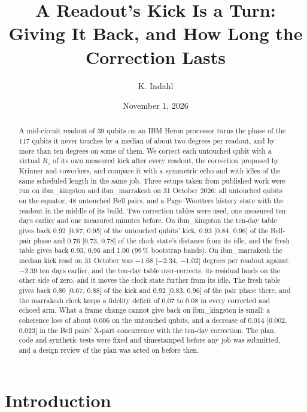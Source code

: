 \documentclass[reprint,amsmath,amssymb,aps,superscriptaddress,nofootinbib]{revtex4-2}
\begin{document}
\title{A Readout's Kick Is a Turn: Giving It Back, and How Long the Correction Lasts}

\author{K. Indahl}

\date{November 1, 2026}

\begin{abstract}
A mid-circuit readout of 39 qubits on an IBM Heron processor turns the phase of the 117 qubits it never touches by a median of about two degrees per readout, and by more than ten degrees on some of them. We correct each untouched qubit with a virtual $R_z$ of its own measured kick after every readout, the correction proposed by Krinner and coworkers, and compare it with a symmetric echo and with idles of the same scheduled length in the same job. Three setups taken from published work were run on ibm\_kingston and ibm\_marrakesh on 31 October 2026: all untouched qubits on the equator, 48 untouched Bell pairs, and a Page--Wootters history state with the readout in the middle of its build. Two correction tables were used, one measured ten days earlier and one measured minutes before. On ibm\_kingston the ten-day table gives back 0.92 [0.87, 0.95] of the untouched qubits' kick, 0.93 [0.84, 0.96] of the Bell-pair phase and 0.76 [0.73, 0.78] of the clock state's distance from its idle, and the fresh table gives back 0.93, 0.96 and 1.00 (99\,\% bootstrap bands). On ibm\_marrakesh the median kick read on 31 October was $-1.68$ [$-2.34$, $-1.02$] degrees per readout against $-2.39$ ten days earlier, and the ten-day table over-corrects: its residual lands on the other side of zero, and it moves the clock state further from its idle. The fresh table gives back 0.80 [0.67, 0.88] of the kick and 0.92 [0.83, 0.96] of the pair phase there, and the marrakesh clock keeps a fidelity deficit of 0.07 to 0.08 in every corrected and echoed arm. What a frame change cannot give back on ibm\_kingston is small: a coherence loss of about 0.006 on the untouched qubits, and a decrease of 0.014 [0.002, 0.023] in the Bell pairs' X-part concurrence with the ten-day correction. The plan, code and synthetic tests were fixed and timestamped before any job was submitted, and a design review of the plan was acted on before then.
\end{abstract}

\maketitle

\section{Introduction}
\end{document}
